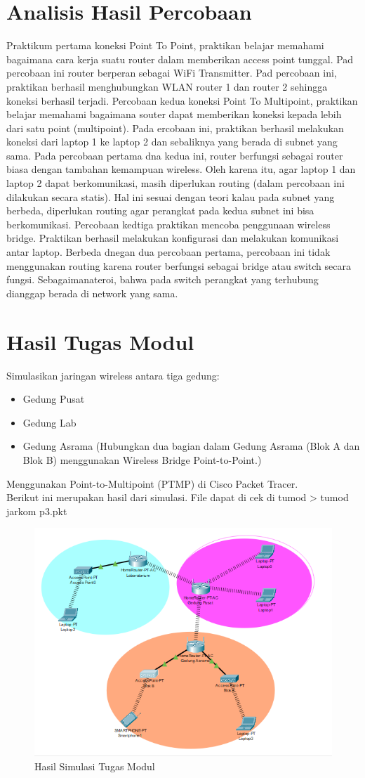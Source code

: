 \section{Analisis Hasil Percobaan}
Praktikum pertama koneksi Point To Point, praktikan belajar memahami bagaimana cara kerja suatu router dalam memberikan access point tunggal. Pad percobaan ini router berperan sebagai WiFi Transmitter. Pad percobaan ini, praktikan berhasil menghubungkan WLAN router 1 dan router 2 sehingga koneksi berhasil terjadi. Percobaan kedua koneksi Point To Multipoint, praktikan belajar memahami bagaimana souter dapat memberikan koneksi kepada lebih dari satu point (multipoint). Pada ercobaan ini, praktikan berhasil melakukan koneksi dari laptop 1 ke laptop 2 dan sebaliknya yang berada  di subnet yang sama. Pada percobaan pertama dna kedua ini, router berfungsi sebagai router biasa dengan tambahan kemampuan wireless. Oleh karena itu, agar laptop 1 dan laptop 2 dapat berkomunikasi, masih diperlukan routing (dalam percobaan ini dilakukan secara statis). Hal ini sesuai dengan teori kalau pada subnet yang berbeda, diperlukan routing agar perangkat pada kedua subnet ini bisa berkomunikasi. Percobaan kedtiga praktikan mencoba penggunaan wireless bridge. Praktikan berhasil melakukan konfigurasi dan melakukan komunikasi antar laptop. Berbeda dnegan dua percobaan pertama, percobaan ini tidak menggunakan routing karena router berfungsi sebagai bridge atau switch secara fungsi. Sebagaimanateroi, bahwa pada switch perangkat yang terhubung dianggap berada di network yang sama.

\section{Hasil Tugas Modul}
Simulasikan jaringan wireless antara tiga gedung:
\begin{itemize}
  \item Gedung Pusat
  \item Gedung Lab
  \item Gedung Asrama (Hubungkan dua bagian dalam Gedung Asrama (Blok A dan Blok B) menggunakan Wireless Bridge Point-to-Point.)
\end{itemize}
Menggunakan Point-to-Multipoint (PTMP) di Cisco Packet Tracer. \\

Berikut ini merupakan hasil dari simulasi. File dapat di cek di tumod > tumod jarkom p3.pkt
\begin{figure}[htbp]
    \centering
    \includegraphics[width=0.5\linewidth]{tumod/tumod jarkom3.png} 
    \caption{Hasil Simulasi Tugas Modul}
    \label{fig:tumod}
\end{figure}



